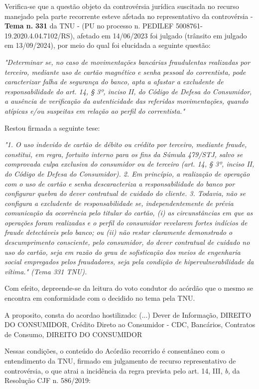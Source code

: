 \documentclass[12pt]{article}
\begin{document}
\justifying
\noindent Verifica-se que a questão objeto da controvérsia jurídica suscitada no recurso manejado pela parte recorrente esteve afetada no representativo da controvérsia - \textbf{Tema n. }\textbf{331} da TNU - (PU no processo n. PEDILEF 5008761-19.2020.4.04.7102/RS),  afetado em 14/06/2023 foi julgado (trânsito em julgado em 13/09/2024), por meio do qual foi elucidada a seguinte questão:

\noindent \textit{"Determinar se, no caso de movimentações bancárias fraudulentas realizadas por terceiro, mediante uso de cartão magnético e senha pessoal do correntista, pode caracterizar falha de segurança do banco, apta a afastar a excludente de responsabilidade do art. 14, § 3º, inciso II, do Código de Defesa do Consumidor, a ausência de verificação da autenticidade das referidas movimentações, quando atípicas e/ou suspeitas em relação ao perfil do correntista."}

\noindent Restou firmada a seguinte tese:

\noindent \textit{"1. O uso indevido de cartão de débito ou crédito por terceiro, mediante fraude, constitui, em regra, fortuito interno para os fins da Súmula 479/STJ, salvo se comprovada culpa exclusiva do consumidor ou de terceiro (art. 14, § 3º, inciso II, do Código de Defesa do Consumidor). 2. Em princípio, a realização de operação com o uso de cartão e senha descaracteriza a responsabilidade do banco por configurar quebra do dever contratual de cuidado do cliente. 3. Todavia, não se configura a excludente de responsabilidade se, independentemente de prévia comunicação da ocorrência pelo titular do cartão, (i) as circunstâncias em que as operações foram realizadas e o perfil do consumidor revelarem fortes indícios de fraude detectáveis pelo banco; ou (ii) não restar claramente demonstrado o descumprimento consciente, pelo consumidor, do dever contratual de cuidado no uso do cartão, seja em razão do grau de sofisticação dos meios de engenharia social empregados pelos fraudadores, seja pela condição de hipervulnerabilidade da vítima." (Tema 331 TNU).}

\noindent Com efeito, depreende-se da leitura do voto condutor do acórdão que o mesmo se encontra em conformidade com o decidido no  tema pela TNU.

\noindent A proposito, consta do acordao hostilizado: (...) Dever de Informação, DIREITO DO CONSUMIDOR, Crédito Direto ao Consumidor - CDC, Bancários, Contratos de Consumo, DIREITO DO CONSUMIDOR

\noindent Nessas condições, o conteúdo do Acórdão recorrido é consentâneo com o entendimento da TNU, firmado em julgamento de recurso representativo de controvérsia, o que atrai a incidência da regra prevista pelo art. 14, III, \textit{b,} da Resolução CJF n. 586/2019:
\end{document}
